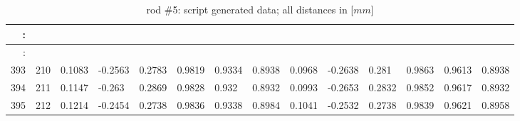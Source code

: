 \begin{table}[p]
{\begin{minipage}{\textheight}
\begin{tabular}{rr||lll|lll||lll|lll}
 :      &      &         &         &        &        &        &        &         &         &        &        &        &        \\
 \hline
 :      &      &         &         &        &        &        &        &         &         &        &        &        &        \\
 393    & 210  & 0.1083  & -0.2563 & 0.2783 & 0.9819 & 0.9334 & 0.8938 & 0.0968  & -0.2638 & 0.281  & 0.9863 & 0.9613 & 0.8938 \\
 394    & 211  & 0.1147  & -0.263  & 0.2869 & 0.9828 & 0.932  & 0.8932 & 0.0993  & -0.2653 & 0.2832 & 0.9852 & 0.9617 & 0.8932 \\
 395    & 212  & 0.1214  & -0.2454 & 0.2738 & 0.9836 & 0.9338 & 0.8984 & 0.1041  & -0.2532 & 0.2738 & 0.9839 & 0.9621 & 0.8958
 \end{tabular}
        \caption{rod \#5: script generated data; all distances in [$mm$]}
        \label{tab:spit-out-5}
      \end{minipage}
    }
  \end{table}


